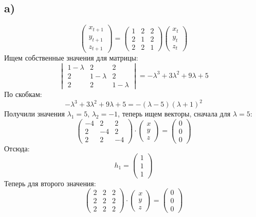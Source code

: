 \documentclass[a4paper,12pt]{article}
\begin{document}
\subsection*{a)}
\[
\begin{pmatrix}
x_{t + 1} \\
y_{t + 1} \\
z_{t + 1} 
\end{pmatrix}
=
\begin{pmatrix}
1 & 2 & 2 \\
2 & 1 & 2 \\
2 & 2  & 1 
\end{pmatrix}
\begin{pmatrix}
x_{t } \\
y_{t} \\
z_{t } 
\end{pmatrix}
\]
Ищем собственные значения для матрицы:
\[
\begin{vmatrix}
1 - \lambda & 2 & 2 \\
2 & 1 - \lambda & 2 \\
2 & 2 & 1 - \lambda 
\end{vmatrix} = -\lambda^3 + 3\lambda^2 + 9\lambda + 5
\]
По скобкам:
\[
-\lambda^3 + 3\lambda^2 + 9\lambda + 5 = -(\lambda - 5)(\lambda + 1)^2
\]
Получили значения $\lambda_{1} = 5$, $\lambda_2 = -1$, теперь ищем векторы, сначала для $\lambda = 5$:
\[
\begin{pmatrix}
-4& 2 & 2 \\
2 & -4 & 2 \\
2 & 2 & -4
\end{pmatrix} 
\cdot
\begin{pmatrix}
x \\
y \\
z 
\end{pmatrix} 
=
\begin{pmatrix}
0 \\
0 \\
0
\end{pmatrix}
\]
Отсюда:
\[
h_1 = \begin{pmatrix}
1 \\ 1 \\ 1
\end{pmatrix}
\]
Теперь для второго значения:
\[
\begin{pmatrix}
2& 2 & 2 \\
2 & 2 & 2 \\
2 & 2 & 2
\end{pmatrix} 
\cdot
\begin{pmatrix}
x \\
y \\
z 
\end{pmatrix} 
=
\begin{pmatrix}
0 \\
0 \\
0
\end{pmatrix}
\]
\end{document}
